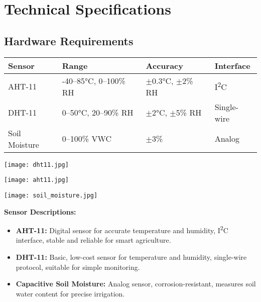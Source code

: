 \documentclass[12pt,a4paper]{article}
\begin{document}
\section{Technical Specifications}

\subsection{Hardware Requirements}
\begin{tabular}{@{}llll@{}}
\toprule
\textbf{Sensor} & \textbf{Range} & \textbf{Accuracy} & \textbf{Interface} \\
\midrule
AHT-11 & -40–85°C, 0–100\% RH & $\pm$0.3°C, $\pm$2\% RH & I\textsuperscript{2}C \\
DHT-11 & 0–50°C, 20–90\% RH & $\pm$2°C, $\pm$5\% RH & Single-wire \\
Soil Moisture & 0–100\% VWC & $\pm$3\% & Analog \\
\bottomrule
\end{tabular}

\vspace{0.5cm}
\noindent
\begin{minipage}[t]{0.24\textwidth}
    \centering
    \texttt{[image: dht11.jpg]}
\end{minipage}
\hfill
\begin{minipage}[t]{0.24\textwidth}
    \centering
    \texttt{[image: aht11.jpg]}
\end{minipage}
\hfill
\begin{minipage}[t]{0.24\textwidth}
    \centering
    \texttt{[image: soil\_moisture.jpg]}
\end{minipage}

\vspace{0.5cm}
\textbf{Sensor Descriptions:}
\begin{itemize}[leftmargin=*]
    \item \textbf{AHT-11:} Digital sensor for accurate temperature and humidity, I\textsuperscript{2}C interface, stable and reliable for smart agriculture.
    \item \textbf{DHT-11:} Basic, low-cost sensor for temperature and humidity, single-wire protocol, suitable for simple monitoring.
    \item \textbf{Capacitive Soil Moisture:} Analog sensor, corrosion-resistant, measures soil water content for precise irrigation.
\end{itemize}
\end{document}
